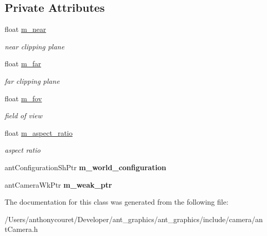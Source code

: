 \subsection*{Private Attributes}
\begin{DoxyCompactItemize}
\item 
\hypertarget{classant_camera_a29ecb5d46ef6f2bbd3adca58208c71c0}{float \hyperlink{classant_camera_a29ecb5d46ef6f2bbd3adca58208c71c0}{m\+\_\+near}}\label{classant_camera_a29ecb5d46ef6f2bbd3adca58208c71c0}

\begin{DoxyCompactList}\small\item\em near clipping plane \end{DoxyCompactList}\item 
\hypertarget{classant_camera_ad3f5a820c26d66965b42015f153dd868}{float \hyperlink{classant_camera_ad3f5a820c26d66965b42015f153dd868}{m\+\_\+far}}\label{classant_camera_ad3f5a820c26d66965b42015f153dd868}

\begin{DoxyCompactList}\small\item\em far clipping plane \end{DoxyCompactList}\item 
\hypertarget{classant_camera_adb5f87e2729f8dbc0a702f809982409f}{float \hyperlink{classant_camera_adb5f87e2729f8dbc0a702f809982409f}{m\+\_\+fov}}\label{classant_camera_adb5f87e2729f8dbc0a702f809982409f}

\begin{DoxyCompactList}\small\item\em field of view \end{DoxyCompactList}\item 
\hypertarget{classant_camera_a82f11705fc77ba2e86c667e31ea41e32}{float \hyperlink{classant_camera_a82f11705fc77ba2e86c667e31ea41e32}{m\+\_\+aspect\+\_\+ratio}}\label{classant_camera_a82f11705fc77ba2e86c667e31ea41e32}

\begin{DoxyCompactList}\small\item\em aspect ratio \end{DoxyCompactList}\item 
\hypertarget{classant_camera_a7807fb24803b6095cb9c19a067adcc9c}{ant\+Configuration\+Sh\+Ptr {\bfseries m\+\_\+world\+\_\+configuration}}\label{classant_camera_a7807fb24803b6095cb9c19a067adcc9c}

\item 
\hypertarget{classant_camera_a6ef6edf0c821f562036dd4294b8e1e57}{ant\+Camera\+Wk\+Ptr {\bfseries m\+\_\+weak\+\_\+ptr}}\label{classant_camera_a6ef6edf0c821f562036dd4294b8e1e57}

\end{DoxyCompactItemize}


The documentation for this class was generated from the following file\+:\begin{DoxyCompactItemize}
\item 
/\+Users/anthonycouret/\+Developer/ant\+\_\+graphics/ant\+\_\+graphics/include/camera/ant\+Camera.\+h\end{DoxyCompactItemize}
